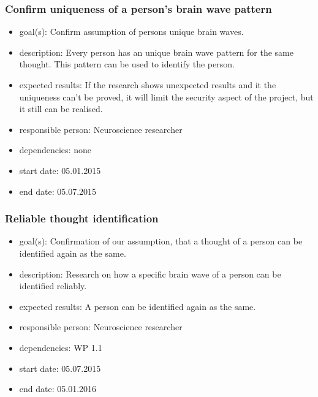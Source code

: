 \subsubsection{Confirm uniqueness of a person’s brain wave pattern}
\begin{itemize}
 \item goal(s): Confirm assumption of persons unique brain waves.
 \item description: Every person has an unique brain wave pattern for the same thought. This pattern can be used to identify the person.
 \item expected results: If the research shows unexpected results and it the uniqueness can’t be proved, it will limit the security aspect of the project, but it still can be realised.
 \item responsible person: Neuroscience researcher
 \item dependencies: none
 \item start date: 05.01.2015
 \item end date: 05.07.2015
\end{itemize}

\subsubsection{Reliable thought identification}
\begin{itemize}
 \item goal(s): Confirmation of our assumption, that a thought of a person can be identified again as the same.
 \item description: Research on how a specific brain wave of a person can be identified reliably.
 \item expected results: A person can be identified again as the same.
 \item responsible person: Neuroscience researcher
 \item dependencies: WP 1.1
 \item start date: 05.07.2015
 \item end date: 05.01.2016
\end{itemize}

